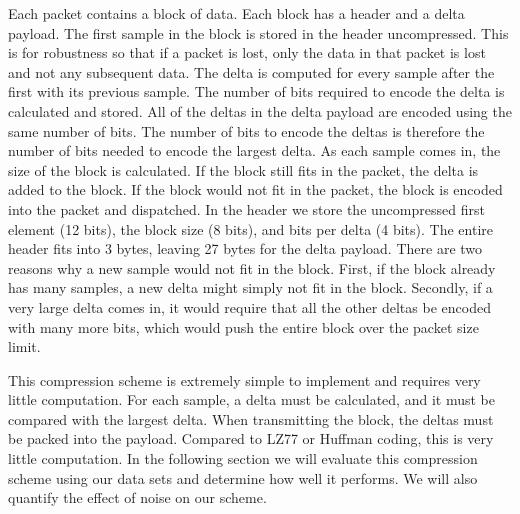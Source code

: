 Each packet contains a block of data. Each block has a header and a
delta payload. The first sample in the block is stored in the header
uncompressed. This is for robustness so that if a packet is lost, only
the data in that packet is lost and not any subsequent data. The delta
is computed for every sample after the first with its previous
sample. The number of bits required to encode the delta is calculated
and stored. All of the deltas in the delta payload are encoded using
the same number of bits. The number of bits to encode the deltas is
therefore the number of bits needed to encode the largest delta. As
each sample comes in, the size of the block is calculated. If the
block still fits in the packet, the delta is added to the block. If
the block would not fit in the packet, the block is encoded into the
packet and dispatched. In the header we store the uncompressed first
element (12 bits), the block size (8 bits), and bits per delta (4
bits). The entire header fits into 3 bytes, leaving 27 bytes for the
delta payload. There are two reasons why a new sample would not fit in
the block. First, if the block already has many samples, a new delta
might simply not fit in the block. Secondly, if a very large delta
comes in, it would require that all the other deltas be encoded with
many more bits, which would push the entire block over the packet size
limit. 

This compression scheme is extremely simple to implement and requires
very little computation. For each sample, a delta must be calculated,
and it must be compared with the largest delta. When transmitting the
block, the deltas must be packed into the payload. Compared to LZ77 or
Huffman coding, this is very little computation. In the following
section we will evaluate this compression scheme using our data sets
and determine how well it performs. We will also quantify the effect
of noise on our scheme.

